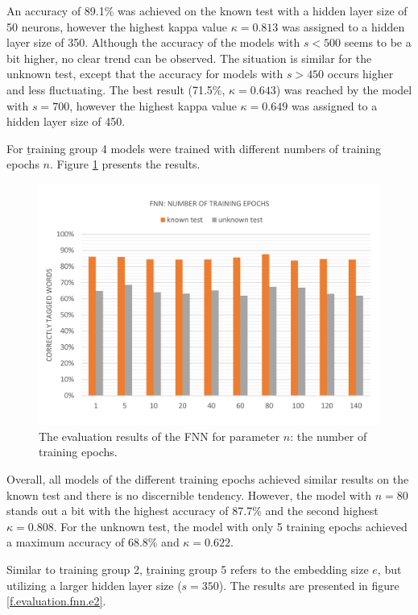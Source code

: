 An accuracy of 89.1\% was achieved on the known test with a hidden layer size of 50 neurons, however the highest kappa value $\kappa=0.813$ was assigned to a hidden layer size of 350. Although the accuracy of the models with $s<500$ seems to be a bit higher, no clear trend can be observed. The situation is similar for the unknown test, except that the accuracy for models with $s>450$ occurs higher and less fluctuating. The best result (71.5\%, $\kappa=0.643$) was reached by the model with $s=700$, however the highest kappa value $\kappa=0.649$ was assigned to a hidden layer size of 450.

For \b{training group 4} models were trained with different numbers of training epochs $n$. Figure \ref{f.evaluation.fnn.n} presents the results.

\begin{figure}[H]
	\hspace{-5mm}\includegraphics[width=1.07\textwidth]{images/evaluation_fnn_n}
	\caption[FNN Evaluation: Number of Training Epochs]{The evaluation results of the FNN for parameter $n$: the number of training epochs.}
	\label{f.evaluation.fnn.n}
\end{figure}

Overall, all models of the different training epochs achieved similar results on the known test and there is no discernible tendency. However, the model with $n=80$ stands out a bit with the highest accuracy of 87.7\% and the second highest $\kappa=0.808$. For the unknown test, the model with only 5 training epochs achieved a maximum accuracy of 68.8\% and $\kappa=0.622$.

Similar to training group 2, \b{training group 5} refers to the embedding size $e$, but utilizing a larger hidden layer size ($s=350$). The results are presented in figure {\ref{f.evaluation.fnn.e2}}.

